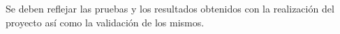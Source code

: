 \clearpage
{}
Se deben reflejar las pruebas y los resultados obtenidos con la realización del proyecto así como
la validación de los mismos.
